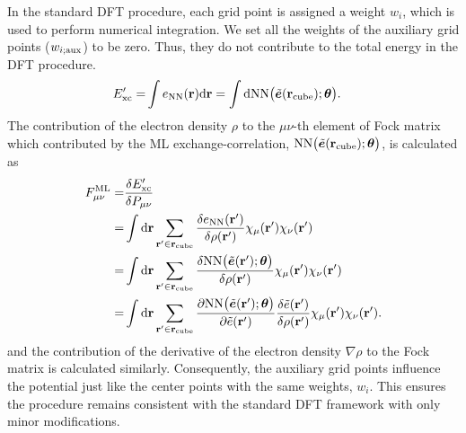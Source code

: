 \documentclass[%
twocolumn,
amsmath,
amssymb,
groupedaddress,
reprint,%
]{revtex4-2}
\renewcommand{\d}{{\rm d}}
\newcommand{\nl}{\nonumber \\}
\newcommand{\brm}[1]{\bm{\mathrm{#1}}}
\begin{document}
In the standard DFT procedure, each grid point is assigned a weight $w_{i}$, which is used to perform numerical integration.
% 
We set all the weights of the auxiliary grid points ($w_{i;\rm{aux}}$) to be zero. Thus, they do not contribute to the total energy in the DFT procedure.
% 
\begin{align}
  E'_{\rm{xc}} =
   & \int e_{\rm{NN}}(\mathbf{r}) \d \mathbf{r} = \int \d {\rm{NN}}\big( \tilde{\bm{e}}(\brm{r}_{\rm{cube}}); \bm{\theta} \big).
\end{align}
% 
The contribution of the electron density $\rho$ to the $\mu \nu$-th element of Fock matrix which contributed by the ML exchange-correlation, ${\rm{NN}}\big( \tilde{\bm{e}}(\brm{r}_{\rm{cube}}); \bm{\theta} \big)$,  is calculated as
% 
\begin{align}
  F_{\mu \nu}^{\rm{ML}}
  = & \frac{\delta E'_{\rm{xc}}}{\delta P_{\mu \nu}} \nl
  = & \int \d \brm{r} \sum_{\brm{r}' \in \brm{r}_{\rm{cube}}} \frac{\delta e_{\rm{NN}}(\brm{r}')} {\delta \rho(\brm{r}')} \chi_{\mu}(\brm{r}') \chi_{\nu}(\brm{r}') \nl
  = & \int \d \brm{r} \sum_{\brm{r}' \in \brm{r}_{\rm{cube}}} \frac{\delta {\rm{NN}}\big( \tilde{\bm{e}}(\brm{r}'); \bm{\theta} \big)}{\delta \rho(\brm{r}')} \chi_{\mu}(\brm{r}') \chi_{\nu}(\brm{r}') \nl
  = & \int \d \brm{r} \sum_{\brm{r}' \in \brm{r}_{\rm{cube}}} \frac{\partial {\rm{NN}}\big( \tilde{\bm{e}}(\brm{r}'); \bm{\theta} \big)}{\partial \tilde{e}(\brm{r}')} \frac{\delta \tilde{e}(\brm{r}')}{\delta \rho(\brm{r}')} \chi_{\mu}(\brm{r}') \chi_{\nu}(\brm{r}').
\end{align}
% 
and the contribution of the derivative of the electron density $\nabla \rho$ to the Fock matrix is calculated similarly.
% 
Consequently, the auxiliary grid points influence the potential just like the center points with the same weights, $w_{i}$.
% 
This ensures the procedure remains consistent with the standard DFT framework with only minor modifications.
\end{document}
